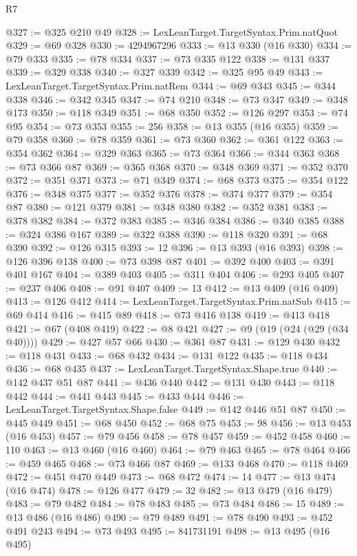 \begin{lexlean}{R7}
\begin{coremodule}
@327 := @325 @210 @49
@328 := LexLeanTarget.TargetSyntax.Prim.natQuot
@329 := @69 @328
@330 := 4294967296
@333 := @13 @330 (@16 @330)
@334 := @79 @333
@335 := @78 @334
@337 := @73 @335 @122
@338 := @131 @337
@339 := @329 @338
@340 := @327 @339
@342 := @325 @95 @49
@343 := LexLeanTarget.TargetSyntax.Prim.natRem
@344 := @69 @343
@345 := @344 @338
@346 := @342 @345
@347 := @74 @210
@348 := @73 @347
@349 := @348 @173
@350 := @118 @349
@351 := @68 @350
@352 := @126 @297
@353 := @74 @95
@354 := @73 @353
@355 := 256
@358 := @13 @355 (@16 @355)
@359 := @79 @358
@360 := @78 @359
@361 := @73 @360
@362 := @361 @122
@363 := @354 @362
@364 := @329 @363
@365 := @73 @364
@366 := @344 @363
@368 := @73 @366 @87
@369 := @365 @368
@370 := @348 @369
@371 := @352 @370
@372 := @351 @371
@373 := @71 @349
@374 := @68 @373
@375 := @354 @122
@376 := @348 @375
@377 := @352 @376
@378 := @374 @377
@379 := @354 @87
@380 := @121 @379
@381 := @348 @380
@382 := @352 @381
@383 := @378 @382
@384 := @372 @383
@385 := @346 @384
@386 := @340 @385
@388 := @324 @386 @167
@389 := @322 @388
@390 := @118 @320
@391 := @68 @390
@392 := @126 @315
@393 := 12
@396 := @13 @393 (@16 @393)
@398 := @126 @396 @138
@400 := @73 @398 @87
@401 := @392 @400
@403 := @391 @401 @167
@404 := @389 @403
@405 := @311 @404
@406 := @293 @405
@407 := @237 @406
@408 := @91 @407
@409 := 13
@412 := @13 @409 (@16 @409)
@413 := @126 @412
@414 := LexLeanTarget.TargetSyntax.Prim.natSub
@415 := @69 @414
@416 := @415 @89
@418 := @73 @416 @138
@419 := @413 @418
@421 := @67 (@408 @419)
@422 := @8 @421
@427 := @9 (@19 (@24 (@29 (@34 @40))))
@429 := @427 @57 @66
@430 := @361 @87
@431 := @129 @430
@432 := @118 @431
@433 := @68 @432
@434 := @131 @122
@435 := @118 @434
@436 := @68 @435
@437 := LexLeanTarget.TargetSyntax.Shape.true
@440 := @142 @437 @51 @87
@441 := @436 @440
@442 := @131 @430
@443 := @118 @442
@444 := @441 @443
@445 := @433 @444
@446 := LexLeanTarget.TargetSyntax.Shape.false
@449 := @142 @446 @51 @87
@450 := @445 @449
@451 := @68 @450
@452 := @68 @75
@453 := 98
@456 := @13 @453 (@16 @453)
@457 := @79 @456
@458 := @78 @457
@459 := @452 @458
@460 := 110
@463 := @13 @460 (@16 @460)
@464 := @79 @463
@465 := @78 @464
@466 := @459 @465
@468 := @73 @466 @87
@469 := @133 @468
@470 := @118 @469
@472 := @451 @470 @449
@473 := @68 @472
@474 := 14
@477 := @13 @474 (@16 @474)
@478 := @126 @477
@479 := 32
@482 := @13 @479 (@16 @479)
@483 := @79 @482
@484 := @78 @483
@485 := @73 @484
@486 := 15
@489 := @13 @486 (@16 @486)
@490 := @79 @489
@491 := @78 @490
@493 := @452 @491 @243
@494 := @73 @493
@495 := 841731191
@498 := @13 @495 (@16 @495)

\end{coremodule}
\end{lexlean}
